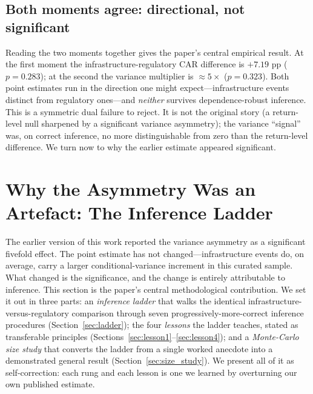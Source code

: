 \documentclass[pdflatex,sn-mathphys-num]{sn-jnl}
\theoremstyle{thmstyleone}
\theoremstyle{thmstyletwo}
\theoremstyle{thmstylethree}
\begin{document}
\subsection{Both moments agree: directional, not significant}

Reading the two moments together gives the paper's central empirical result. At the first moment the infrastructure-regulatory CAR difference is $+7.19$ pp ($p=0.283$); at the second the variance multiplier is $\approx 5\times$ ($p=0.323$). Both point estimates run in the direction one might expect---infrastructure events distinct from regulatory ones---and \emph{neither} survives dependence-robust inference. This is a symmetric dual failure to reject. It is not the original story (a return-level null sharpened by a significant variance asymmetry); the variance ``signal'' was, on correct inference, no more distinguishable from zero than the return-level difference. We turn now to why the earlier estimate appeared significant.


\section{Why the Asymmetry Was an Artefact: The Inference Ladder}\label{sec:artifact}

The earlier version of this work reported the variance asymmetry as a significant fivefold effect. The point estimate has not changed---infrastructure events do, on average, carry a larger conditional-variance increment in this curated sample. What changed is the significance, and the change is entirely attributable to inference. This section is the paper's central methodological contribution. We set it out in three parts: an \emph{inference ladder} that walks the identical infrastructure-versus-regulatory comparison through seven progressively-more-correct inference procedures (Section~\ref{sec:ladder}); the four \emph{lessons} the ladder teaches, stated as transferable principles (Sections~\ref{sec:lesson1}--\ref{sec:lesson4}); and a \emph{Monte-Carlo size study} that converts the ladder from a single worked anecdote into a demonstrated general result (Section~\ref{sec:size_study}). We present all of it as self-correction: each rung and each lesson is one we learned by overturning our own published estimate.
\end{document}
